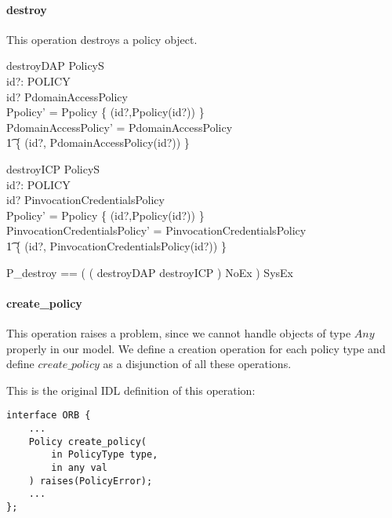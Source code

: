 \paragraph{destroy}
This operation destroys a policy object.
\begin{schema}{destroyDAP}
  \Delta PolicyS \\
  id?: POLICY \\
  \where
  id? \in \dom PdomainAccessPolicy \\

  Ppolicy' = Ppolicy \setminus \{ (id?,Ppolicy(id?)) \} \\

  PdomainAccessPolicy' = PdomainAccessPolicy \setminus \\
  \t1 \{ (id?, PdomainAccessPolicy(id?)) \} \\
\end{schema}
\begin{schema}{destroyICP}
  \Delta PolicyS \\
  id?: POLICY \\
  \where
  id? \in \dom PinvocationCredentialsPolicy \\

  Ppolicy' = Ppolicy \setminus \{ (id?,Ppolicy(id?)) \} \\

  PinvocationCredentialsPolicy' = PinvocationCredentialsPolicy \setminus \\
  \t1 \{ (id?, PinvocationCredentialsPolicy(id?)) \} \\ 
\end{schema}
\begin{zed}
  P\_destroy == ( ( destroyDAP \lor destroyICP ) \land NoEx ) \lor SysEx \\
\end{zed}


\paragraph{create\_policy}
This operation raises a problem, since we cannot handle objects of type $Any$
properly in our model.  We define a creation operation for each policy type and
define $create\_policy$ as a disjunction of all these operations.

This is the original IDL definition of this operation:
\begin{verbatim}
interface ORB {
    ...
    Policy create_policy(
        in PolicyType type,
        in any val
    ) raises(PolicyError);
    ...
};
\end{verbatim}


